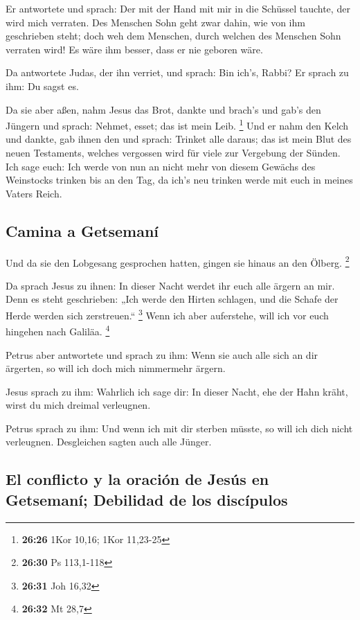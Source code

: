  Er antwortete und sprach: Der mit der Hand mit mir in
die Schüssel tauchte, der wird mich verraten.  Des
Menschen Sohn geht zwar dahin, wie von ihm geschrieben steht; doch weh
dem Menschen, durch welchen des Menschen Sohn verraten wird! Es wäre ihm
besser, dass er nie geboren wäre.

 Da antwortete Judas, der ihn verriet, und sprach: Bin
ich's, Rabbi? Er sprach zu ihm: Du sagst es.

 Da sie aber aßen, nahm Jesus das Brot, dankte und
brach's und gab's den Jüngern und sprach: Nehmet, esset; das ist mein
Leib. \footnote{\textbf{26:26} 1Kor 10,16; 1Kor 11,23-25}
 Und er nahm den Kelch und dankte, gab ihnen den und
sprach: Trinket alle daraus;  das ist mein Blut des neuen
Testaments, welches vergossen wird für viele zur Vergebung der Sünden.
 Ich sage euch: Ich werde von nun an nicht mehr von
diesem Gewächs des Weinstocks trinken bis an den Tag, da ich's neu
trinken werde mit euch in meines Vaters Reich.

\hypertarget{camina-a-getsemanuxed}{%
\subsection{Camina a Getsemaní}\label{camina-a-getsemanuxed}}

 Und da sie den Lobgesang gesprochen hatten, gingen sie
hinaus an den Ölberg. \footnote{\textbf{26:30} Ps 113,1-118}

 Da sprach Jesus zu ihnen: In dieser Nacht werdet ihr
euch alle ärgern an mir. Denn es steht geschrieben: „Ich werde den
Hirten schlagen, und die Schafe der Herde werden sich zerstreuen.``
\footnote{\textbf{26:31} Joh 16,32}  Wenn ich aber
auferstehe, will ich vor euch hingehen nach Galiläa. \footnote{\textbf{26:32}
  Mt 28,7}

 Petrus aber antwortete und sprach zu ihm: Wenn sie auch
alle sich an dir ärgerten, so will ich doch mich nimmermehr ärgern.

 Jesus sprach zu ihm: Wahrlich ich sage dir: In dieser
Nacht, ehe der Hahn kräht, wirst du mich dreimal verleugnen.

 Petrus sprach zu ihm: Und wenn ich mit dir sterben
müsste, so will ich dich nicht verleugnen. Desgleichen sagten auch alle
Jünger.

\hypertarget{el-conflicto-y-la-oraciuxf3n-de-jesuxfas-en-getsemanuxed-debilidad-de-los-discuxedpulos}{%
\subsection{El conflicto y la oración de Jesús en Getsemaní; Debilidad
de los
discípulos}\label{el-conflicto-y-la-oraciuxf3n-de-jesuxfas-en-getsemanuxed-debilidad-de-los-discuxedpulos}}

